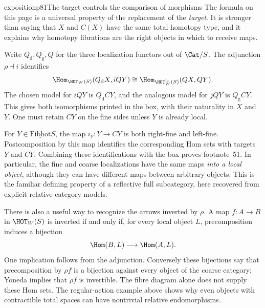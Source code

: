 \begin{dcomment}{exposition}{p81}{The target controls the comparison of morphisms}
The formula on this page is a universal property of the replacement of the \emph{target}. It is stronger than saying that $X$ and $C(X)$ have the same total homotopy type, and it explains why homotopy fibrations are the right objects in which to receive maps.

Write $Q_{\mathrm d},Q_{\mathrm g},Q$ for the three localization functors out of $\Cat/S$. The adjunction $\rho\dashv i$ identifies
\[
 \Hom_{\HOT_W(S)}(Q_{\mathrm d}X,iQY)
       \cong\Hom_{\HOT_W^{\mathrm{lc}}(S)}(QX,QY).
\]
The chosen model for $iQY$ is $Q_{\mathrm d}CY$, and the analogous model for $jQY$ is $Q_{\mathrm g}CY$. This gives both isomorphisms printed in the box, with their naturality in $X$ and $Y$. One must retain $CY$ on the fine sides unless $Y$ is already local.

For $Y\in\underline{\mathrm{Fibhot}}S$, the map $i_Y:Y\to CY$ is both right-fine and left-fine. Postcomposition by this map identifies the corresponding Hom sets with targets $Y$ and $CY$. Combining these identifications with the box proves footnote~51. In particular, the fine and coarse localizations have the same maps \emph{into a local object}, although they can have different maps between arbitrary objects. This is the familiar defining property of a reflective full subcategory, here recovered from explicit relative-category models.

There is also a useful way to recognize the arrows inverted by $\rho$. A map $f:A\to B$ in $\HOT_W(S)$ is inverted if and only if, for every local object $L$, precomposition induces a bijection
\[
 \Hom(B,L)\longrightarrow\Hom(A,L).
\]
One implication follows from the adjunction. Conversely these bijections say that precomposition by $\rho f$ is a bijection against every object of the coarse category; Yoneda implies that $\rho f$ is invertible. The fibre diagram alone does not supply these Hom sets. The regular-action example above shows why even objects with contractible total spaces can have nontrivial relative endomorphisms.
\end{dcomment}

